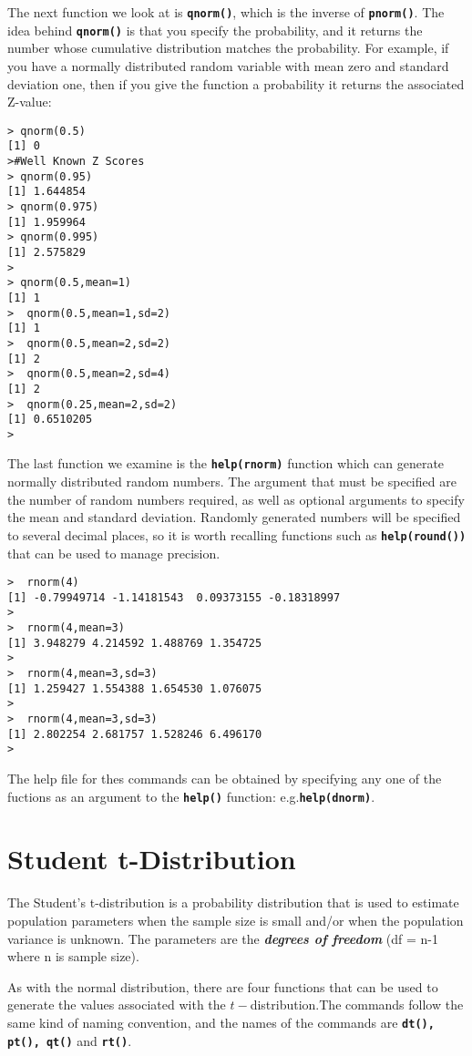 The next function we look at is \texttt{\textbf{qnorm()}}, which is the inverse of \texttt{\textbf{pnorm()}}. The idea behind \texttt{\textbf{qnorm()}} is that you specify the probability, and it returns the number whose cumulative distribution matches the probability. 
For example, if you have a normally distributed random variable with mean zero and standard deviation one, then if you give the function a probability it returns the associated Z-value:


\begin{verbatim}
> qnorm(0.5)
[1] 0
>#Well Known Z Scores
> qnorm(0.95)
[1] 1.644854
> qnorm(0.975)
[1] 1.959964
> qnorm(0.995)
[1] 2.575829
>
> qnorm(0.5,mean=1)
[1] 1
>  qnorm(0.5,mean=1,sd=2)
[1] 1
>  qnorm(0.5,mean=2,sd=2)
[1] 2
>  qnorm(0.5,mean=2,sd=4)
[1] 2
>  qnorm(0.25,mean=2,sd=2)
[1] 0.6510205
> 
\end{verbatim}

The last function we examine is the  \textbf{\texttt{help(rnorm)}} function which can generate normally distributed random numbers. The argument that must be specified are the number of random numbers required, as well as optional arguments to specify the mean and standard deviation. Randomly generated numbers will be specified to several decimal places, so it is worth recalling functions such as \textbf{\texttt{help(round())}} that can be used to manage precision.
\begin{verbatim}
>  rnorm(4)
[1] -0.79949714 -1.14181543  0.09373155 -0.18318997
>
>  rnorm(4,mean=3)
[1] 3.948279 4.214592 1.488769 1.354725
>
>  rnorm(4,mean=3,sd=3)
[1] 1.259427 1.554388 1.654530 1.076075
> 
>  rnorm(4,mean=3,sd=3)
[1] 2.802254 2.681757 1.528246 6.496170
> 
\end{verbatim}

The help file for thes commands can be obtained by specifying any one of the fuctions as an argument to the \textbf{\texttt{help()}} function: e.g.\textbf{\texttt{help(dnorm)}}.
\newpage
\section{Student t-Distribution}
The Student’s t-distribution is a probability distribution that is used to estimate population parameters when the sample size is small and/or when the population variance is unknown.
The parameters are the \textbf{\textit{degrees of freedom}} (df = n-1 where n is sample size).

As with the normal distribution, there are four functions that can be used to generate the values associated with the $t-$distribution.The commands follow the same kind of naming convention, and the names of the commands are \texttt{\textbf{dt(), pt(), qt()}} and \texttt{\textbf{rt()}}.

